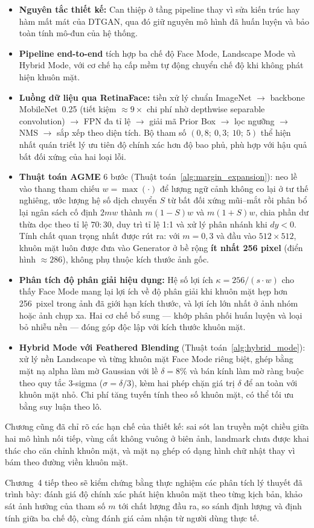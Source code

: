\begin{itemize}
    \item \textbf{Nguyên tắc thiết kế:} Can thiệp ở tầng pipeline thay vì sửa kiến trúc hay hàm mất mát của DTGAN, qua đó giữ nguyên mô hình đã huấn luyện và bảo toàn tính mô-đun của hệ thống.
    \item \textbf{Pipeline end-to-end} tích hợp ba chế độ Face Mode, Landscape Mode và Hybrid Mode, với cơ chế hạ cấp mềm tự động chuyển chế độ khi không phát hiện khuôn mặt.
    \item \textbf{Luồng dữ liệu qua RetinaFace:} tiền xử lý chuẩn ImageNet $\to$ backbone MobileNet~0.25 (tiết kiệm $\approx 9\times$ chi phí nhờ depthwise separable convolution) $\to$ FPN đa tỉ lệ $\to$ giải mã Prior Box $\to$ lọc ngưỡng $\to$ NMS $\to$ sắp xếp theo diện tích. Bộ tham số $(0{,}8;\ 0{,}3;\ 10;\ 5)$ thể hiện nhất quán triết lý ưu tiên độ chính xác hơn độ bao phủ, phù hợp với hậu quả bất đối xứng của hai loại lỗi.
    \item \textbf{Thuật toán AGME} 6 bước (Thuật toán~\ref{alg:margin_expansion}): neo lề vào thang tham chiếu $w = \max(\cdot)$ để lượng ngữ cảnh không co lại ở tư thế nghiêng, ước lượng hệ số dịch chuyển $S$ từ bất đối xứng mũi--mắt rồi phân bổ lại ngân sách cố định $2mw$ thành $m(1-S)w$ và $m(1+S)w$, chia phần dư thừa dọc theo tỉ lệ $70{:}30$, duy trì tỉ lệ 1:1 và xử lý phân nhánh khi $dy < 0$. Tính chất quan trọng nhất được rút ra: với $m = 0{,}3$ và đầu vào $512 \times 512$, khuôn mặt luôn được đưa vào Generator ở bề rộng \textbf{ít nhất 256 pixel} (điển hình $\approx 286$), không phụ thuộc kích thước ảnh gốc.
    \item \textbf{Phân tích độ phân giải hiệu dụng:} Hệ số lợi ích $\kappa = 256/(s \cdot w)$ cho thấy Face Mode mang lại lợi ích về độ phân giải khi khuôn mặt hẹp hơn 256~pixel trong ảnh đã giới hạn kích thước, và lợi ích lớn nhất ở ảnh nhóm hoặc ảnh chụp xa. Hai cơ chế bổ sung --- khớp phân phối huấn luyện và loại bỏ nhiễu nền --- đóng góp độc lập với kích thước khuôn mặt.
    \item \textbf{Hybrid Mode với Feathered Blending} (Thuật toán~\ref{alg:hybrid_mode}): xử lý nền Landscape và từng khuôn mặt Face Mode riêng biệt, ghép bằng mặt nạ alpha làm mờ Gaussian với lề $\delta = 8\%$ và bán kính làm mờ ràng buộc theo quy tắc 3-sigma ($\sigma = \delta/3$), kèm hai phép chặn giá trị $\delta$ để an toàn với khuôn mặt nhỏ. Chi phí tăng tuyến tính theo số khuôn mặt, có thể tối ưu bằng suy luận theo lô.
\end{itemize}

Chương cũng đã chỉ rõ các hạn chế của thiết kế: sai sót lan truyền một chiều giữa hai mô hình nối tiếp, vùng cắt không vuông ở biên ảnh, landmark chưa được khai thác cho căn chỉnh khuôn mặt, và mặt nạ ghép có dạng hình chữ nhật thay vì bám theo đường viền khuôn mặt.

Chương~4 tiếp theo sẽ kiểm chứng bằng thực nghiệm các phân tích lý thuyết đã trình bày: đánh giá độ chính xác phát hiện khuôn mặt theo từng kịch bản, khảo sát ảnh hưởng của tham số $m$ tới chất lượng đầu ra, so sánh định lượng và định tính giữa ba chế độ, cùng đánh giá cảm nhận từ người dùng thực tế.